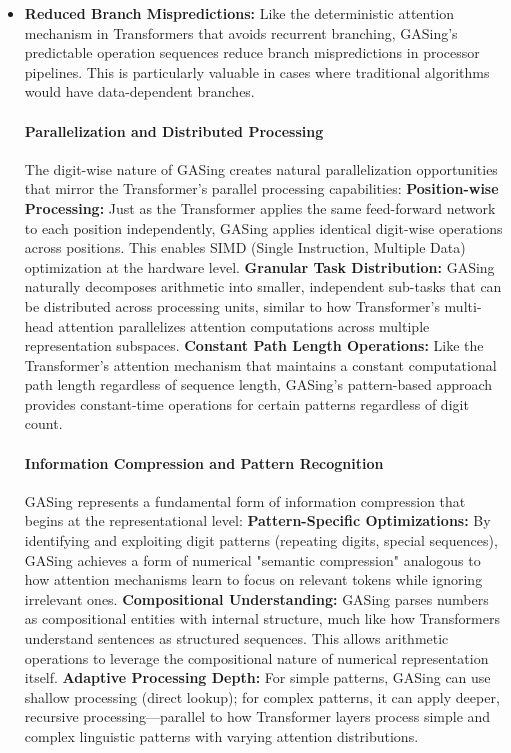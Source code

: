 \begin{itemize}
\item \textbf{\textbf{Reduced Branch Mispredictions}:} Like the deterministic attention mechanism in Transformers that avoids recurrent branching, GASing's predictable operation sequences reduce branch mispredictions in processor pipelines. This is particularly valuable in cases where traditional algorithms would have data-dependent branches.

\vspace{0.5em}
\noindent\hspace{2em}\paragraph{Parallelization and Distributed Processing}  The digit-wise nature of GASing creates natural parallelization opportunities that mirror the Transformer's parallel processing capabilities:   \noindent\textbf{\textbf{Position-wise Processing}:} Just as the Transformer applies the same feed-forward network to each position independently, GASing applies identical digit-wise operations across positions. This enables SIMD (Single Instruction, Multiple Data) optimization at the hardware level.    \noindent\textbf{\textbf{Granular Task Distribution}:} GASing naturally decomposes arithmetic into smaller, independent sub-tasks that can be distributed across processing units, similar to how Transformer's multi-head attention parallelizes attention computations across multiple representation subspaces.    \noindent\textbf{\textbf{Constant Path Length Operations}:} Like the Transformer's attention mechanism that maintains a constant computational path length regardless of sequence length, GASing's pattern-based approach provides constant-time operations for certain patterns regardless of digit count.  \paragraph{Information Compression and Pattern Recognition}  GASing represents a fundamental form of information compression that begins at the representational level:   \noindent\textbf{\textbf{Pattern-Specific Optimizations}:} By identifying and exploiting digit patterns (repeating digits, special sequences), GASing achieves a form of numerical "semantic compression" analogous to how attention mechanisms learn to focus on relevant tokens while ignoring irrelevant ones.    \noindent\textbf{\textbf{Compositional Understanding}:} GASing parses numbers as compositional entities with internal structure, much like how Transformers understand sentences as structured sequences. This allows arithmetic operations to leverage the compositional nature of numerical representation itself.    \noindent\textbf{\textbf{Adaptive Processing Depth}:} For simple patterns, GASing can use shallow processing (direct lookup); for complex patterns, it can apply deeper, recursive processing—parallel to how Transformer layers process simple and complex linguistic patterns with varying attention distributions.
\vspace{0.5em}

\end{itemize}

